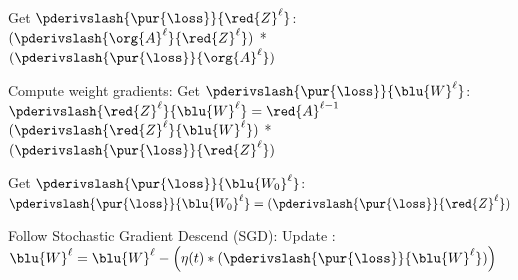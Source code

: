 \begin{codebox}
                                        \li Get $\pderivslash{ \pur{\loss} }{ \red{Z}^{\ell} }$:
                                            \Do
                                                \li
                                                $( \pderivslash{ \org{A}^\ell }{ \red{Z}^{\ell} } )$ 
                                                \;*\;
                                                $( \pderivslash{ \pur{\loss} }{ \org{A}^\ell } )$ 
                                            \End
                                            \li
                                    \End
                                    
                                    
                                \li Compute weight gradients:
                                    \Do
                                        \li Get $\pderivslash{ \pur{\loss} }{ \blu{W}^{\ell} }$:
                                            \Do
                                                \li $\pderivslash{\red{Z}^{\ell}}{ \blu{W}^\ell }
                                                = \red{A}^{\ell-1}$
                                                \li
                                                $( \pderivslash{\red{Z}^{\ell}}{ \blu{W}^\ell } )$ 
                                                \;*\;
                                                $( \pderivslash{ \pur{\loss} }{ \red{Z}^{\ell}} )$ 
                                            \End
                                            \li
                                        
                                        \li Get $\pderivslash{ \pur{\loss} }{ \blu{W_0}^{\ell} }$:
                                            \Do
                                                \li
                                                $\pderivslash{ \pur{\loss} }{ \blu{W_0}^{\ell} }
                                                =
                                                ( \pderivslash{ \pur{\loss} }{ \red{Z}^{\ell}} )$ 
                                            \End
                                            \li
                                    \End
                                    
                                \li Follow Stochastic Gradient Descend (SGD): 
                                    \Do   
                                        \li Update :
                                        \Do
                                            \li $\blu{W}^\ell = \blu{W}^\ell - 
                                            \Big( \eta(t) * (\pderivslash{ \pur{\loss} }{ \blu{W}^{\ell} }) \Big)$
                                        \End
                                        \li
                                        

\end{codebox}
